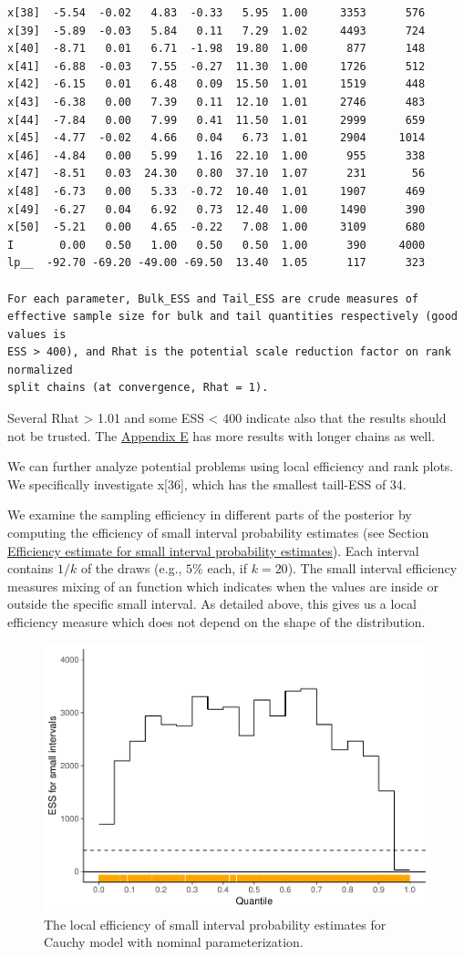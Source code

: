 \documentclass[american,]{article}
\begin{document}
\begin{verbatim}
x[38]  -5.54  -0.02   4.83  -0.33   5.95  1.00     3353      576
x[39]  -5.89  -0.03   5.84   0.11   7.29  1.02     4493      724
x[40]  -8.71   0.01   6.71  -1.98  19.80  1.00      877      148
x[41]  -6.88  -0.03   7.55  -0.27  11.30  1.00     1726      512
x[42]  -6.15   0.01   6.48   0.09  15.50  1.01     1519      448
x[43]  -6.38   0.00   7.39   0.11  12.10  1.01     2746      483
x[44]  -7.84   0.00   7.99   0.41  11.50  1.01     2999      659
x[45]  -4.77  -0.02   4.66   0.04   6.73  1.01     2904     1014
x[46]  -4.84   0.00   5.99   1.16  22.10  1.00      955      338
x[47]  -8.51   0.03  24.30   0.80  37.10  1.07      231       56
x[48]  -6.73   0.00   5.33  -0.72  10.40  1.01     1907      469
x[49]  -6.27   0.04   6.92   0.73  12.40  1.00     1490      390
x[50]  -5.21   0.00   4.65  -0.22   7.08  1.00     3109      680
I       0.00   0.50   1.00   0.50   0.50  1.00      390     4000
lp__  -92.70 -69.20 -49.00 -69.50  13.40  1.05      117      323

For each parameter, Bulk_ESS and Tail_ESS are crude measures of 
effective sample size for bulk and tail quantities respectively (good values is 
ESS > 400), and Rhat is the potential scale reduction factor on rank normalized
split chains (at convergence, Rhat = 1).
\end{verbatim}

Several Rhat \textgreater{} 1.01 and some ESS \textless{} 400 indicate
also that the results should not be trusted. The
\protect\hyperlink{AppendixE}{Appendix E} has more results with longer
chains as well.

We can further analyze potential problems using local efficiency and
rank plots. We specifically investigate x{[}36{]}, which has the
smallest taill-ESS of 34.

We examine the sampling efficiency in different parts of the posterior
by computing the efficiency of small interval probability estimates (see
Section \protect\hyperlink{small_interval_S_eff}{Efficiency estimate for
small interval probability estimates}). Each interval contains \(1/k\)
of the draws (e.g., \(5\%\) each, if \(k=20\)). The small interval
efficiency measures mixing of an function which indicates when the
values are inside or outside the specific small interval. As detailed
above, this gives us a local efficiency measure which does not depend on
the shape of the distribution.
\begin{figure}[t]
  \centering
  \includegraphics[width=0.6\linewidth]{graphics/local-ess-fit-nom-1.pdf}
  \caption{The local efficiency of small interval probability estimates for Cauchy model with nominal parameterization.}
\label{fig:local-ess-fit-nom-1}
\end{figure}
\end{document}
